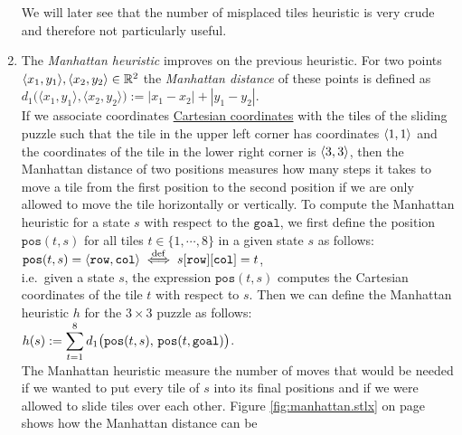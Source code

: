 \begin{enumerate}
      We will later see that the number of misplaced tiles heuristic is very crude and therefore not
      particularly useful.
\item The \emph{\color{blue}Manhattan heuristic} improves on the previous heuristic.  For two points 
      $\pair(x_1, y_1), \pair(x_2, y_2) \in \mathbb{R}^2$ the \emph{\color{blue}Manhattan distance} of these
      points is defined as 
      \\[0.2cm]
      \hspace*{1.3cm}
      $d_1\bigl(\langle x_1, y_1\rangle, \langle x_2, y_2\rangle\bigr) := |x_1 - x_2| + |y_1 - y_2|$.
      \\[0.2cm]
      If we associate coordinates
      \href{https://en.wikipedia.org/wiki/Cartesian_coordinate_system}{Cartesian coordinates} with
      the tiles of the sliding puzzle such that the tile in the upper left corner has coordinates
      $\pair(1, 1)$ and the coordinates of the tile in the lower right corner is $\pair(3, 3)$, then
      the Manhattan distance of two positions measures how many steps it takes to move a tile from
      the first position to the second position if we are only allowed to move the tile horizontally
      or vertically.  To compute the Manhattan heuristic for a state $s$ with respect to the
      $\mathtt{goal}$, we first define the position $\mathtt{pos}(t, s)$ for all tiles 
      $t \in \{1,\cdots, 8\}$ in a given state $s$ as follows:
      \\[0.2cm]
      \hspace*{1.3cm}
      $\mathtt{pos}(t, s) = \pair(\mathtt{row}, \mathtt{col}) 
         \;\stackrel{\mathrm{def}}{\Longleftrightarrow}\; s[\mathtt{row}][\mathtt{col}] = t
      $,
      \\[0.2cm]
      i.e.~given a state $s$, the expression $\mathtt{pos}(t, s)$ computes the Cartesian coordinates of
      the tile $t$ with respect to $s$.  Then we can define the Manhattan heuristic $h$ for the $3 \times 3$ puzzle
      as follows:  
      \\[0.2cm]
      \hspace*{1.3cm}
      $\displaystyle h(s) := \sum\limits_{t=1}^8 d_1\bigl(\mathtt{pos}(t,s),\, \mathtt{pos}(t, \mathtt{goal})\bigr)$.
      \\[0.2cm]
      The Manhattan heuristic measure the number of moves that would be needed if we wanted to put every tile
      of $s$ into its final positions and if we were allowed to slide tiles over each other.  Figure
      \ref{fig:manhattan.stlx} on page \pageref{fig:manhattan.stlx} shows how the Manhattan distance can be

\end{enumerate}
